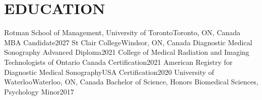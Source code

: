 
\section{\textcolor{airforceblue}{EDUCATION}}
  \resumeSubHeadingListStart
    \resumeSubheading
      {Rotman School of Management, University of Toronto}{Toronto, ON, Canada}
      {MBA Candidate}{2027}
    \vspace{-4pt}
     \resumeSubheading
      {St Clair College}{Windsor, ON, Canada}
      {Diagnostic Medical Sonography Advanced Diploma}{2021}
      \vspace{-4pt}
      \resumeSubheading
      {College of Medical Radiation and Imaging Technologists of Ontario}{ Canada}
      {Certification}{2021}
      \vspace{-4pt}
      \resumeSubheading
      {American Registry for Diagnostic Medical Sonography}{USA}
      {Certification}{2020}
      \vspace{-4pt}
      \resumeSubheading
      {University of Waterloo}{Waterloo, ON, Canada}
      {Bachelor of Science, Honors Biomedical Sciences, Psychology Minor}{2017}
  \resumeSubHeadingListEnd
  \vspace{-10pt}
